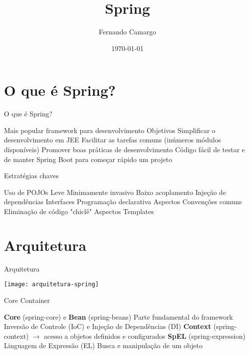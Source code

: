 \documentclass{beamer}
\title{Spring}
\date{\today}
\author{Fernando Camargo}
\institute{ZG Soluções}
\begin{document}
\maketitle

\section{O que é Spring?}

\begin{frame}{O que é Spring?}
 \begin{outline}
   Mais popular framework para desenvolvimento 
   Objetivos
     Simplificar o desenvolvimento em JEE
     Facilitar as tarefas comuns (inúmeros módulos disponíveis)
     Promover boas práticas de desenvolvimento
     Código fácil de testar e de manter
   Spring Boot para começar rápido um projeto
 \end{outline}
\end{frame}

\begin{frame}{Estratégias chaves}
 \begin{outline}
   Uso de POJOs
    \2 Leve
    \2 Minimamente invasivo
   Baixo acoplamento
    \2 Injeção de dependências
    \2 Interfaces
   Programação declarativa
    \2 Aspectos
    \2 Convenções comuns
   Eliminação de código "chiclê"
    \2 Aspectos
    \2 Templates
 \end{outline}
\end{frame}

\section{Arquitetura}

\begin{frame}{Arquitetura}
  \begin{center}
    \texttt{[image: arquitetura-spring]}
  \end{center}
\end{frame}

\begin{frame}{Core Container}
 \begin{outline}
   \textbf{Core} (spring-core) e \textbf{Bean} (spring-beans)
    \2 Parte fundamental do framework
    \2 Inversão de Controle (IoC) e Injeção de Dependências (DI)
   \textbf{Context} (spring-context) $\rightarrow$ acesso a objetos definidos e configurados
   \textbf{SpEL} (spring-expression)
    \2 Linguagem de Expressão (EL)
    \2 Busca e manipulação de um objeto
 \end{outline}
\end{frame}
\end{document}
